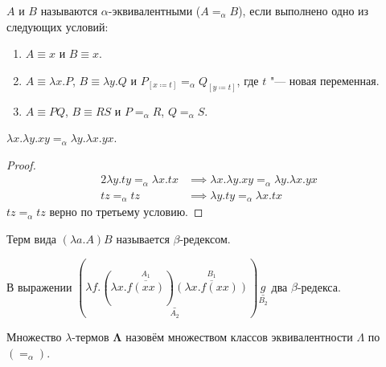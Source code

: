 \begin{definition}
    $A$ и $B$ называются $\alpha$-эквивалентными ($A=_{\alpha}B$), если выполнено одно из следующих условий:
    \begin{enumerate}
        \item $A\equiv{}x$ и $B\equiv{}x$.
        \item $A\equiv{}\lambda{}x.P$, $B\equiv{}\lambda{}y.Q$ и $P_{[x\coloneqq{}t]}=_{\alpha}Q_{[y\coloneqq{}t]}$, где $t$ "--- новая переменная.
        \item $A\equiv{}PQ$, $B\equiv{}RS$ и $P=_{\alpha}R$, $Q=_{\alpha}S$.
    \end{enumerate}
\end{definition}

\begin{example}
    $\lambda{}x.\lambda{}y.xy=_{\alpha}\lambda{}y.\lambda{}x.yx$.
    \begin{proof}
        \begin{alignat*}{2}
            \lambda{}y.ty=_{\alpha}\lambda{}x.tx &\implies \lambda{}x.\lambda{}y.xy=_{\alpha}\lambda{}y.\lambda{}x.yx \\
            tz=_{\alpha}tz &\implies \lambda{}y.ty=_{\alpha}\lambda{}x.tx
        \end{alignat*}
        $tz=_{\alpha}tz$ верно по третьему условию.
    \end{proof}
\end{example}

\begin{definition}
    Терм вида $\left(\lambda{}a.A\right)B$ называется $\beta$-редексом.
\end{definition}

\begin{example}
    В выражении
    $
        (
            \lambda{}f.
                \underset{A_2}{\underline{
                    (\lambda{}x.\overset{A_1}{\overline{f(xx)}})
                    \overset{B_1}{\overline{(\lambda{}x.f(xx))}}
                }}
        )\underset{B_2}{\underline{g}}
    $ два $\beta$-редекса.
\end{example}

\begin{definition}
    Множество $\lambda$-термов $\bm{\Lambda}$ назовём множеством классов эквивалентности $\Lambda$ по $(=_{\alpha})$.
\end{definition}

